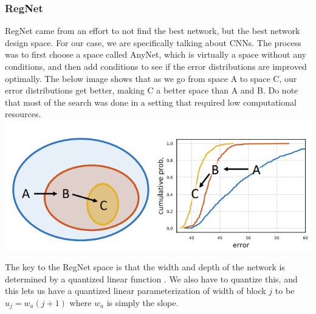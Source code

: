\documentclass[10pt,twocolumn,letterpaper]{article}
\begin{document}
\vspace{-3mm}

\subsubsection{RegNet}

RegNet came from an effort to not find the best network, but the best network design space. For our case, we are specifically talking about CNNs. The process was to first choose a space called AnyNet, which is virtually a space without any conditions, and then add conditions to see if the error distributions are improved optimally. The below image shows that as we go from space A to space C, our error distributions get better, making C a better space than A and B. Do note that most of the search was done in a setting that required low computational resources. 
\includegraphics[width=1.0\linewidth]{docs/latex/images/eric/errordist.png}

The key to the RegNet space is that the width and depth of the network is determined by a quantized linear function \cite{NetworkDesignSpace}. We also have to quantize this, and this lets us have a quantized linear parameterization of width of block $j$ to be $u_j = w_a (j+1)$ where $w_a$ is simply the slope. 
\end{document}
